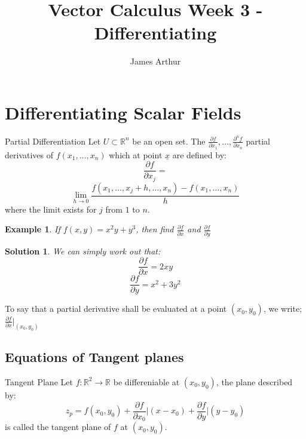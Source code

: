 \documentclass{article}
\title{Vector Calculus Week 3 - Differentiating}
\author{James Arthur}
\newcommand{\R}{\mathbb{R}}
\newcommand{\sub}{\subset}
\newcommand{\pd}[2]{\frac{\partial #1}{\partial #2}}
\newtheorem{example}{Example}
\newtheorem{solution}{Solution}
\begin{document}
\maketitle
\tableofcontents\newpage


\section{Differentiating Scalar Fields}

\noindent\begin{definition}{Partial Differentiation}{}
  Let $\displaystyle{U\sub \R^n}$ be an open set. The $\displaystyle{\pd{f}{x_1}, \dots, \pd{^n f}{x_n}}$ partial derivatives of $f(x_1, \dots, x_n)$ which at point $\underline{x}$ are defined by:
  $$ \pd{f}{x_j} =$$ $$ \lim_{h\to 0}{\frac{f(x_1, \dots, x_j + h, \dots, x_n) - f(x_1,\dots,x_n)}{h}}$$
  where the limit exists for $j$ from $1$ to $n$.
\end{definition}\vspace{10pt}

\begin{example}{
  If $f(x, y) = x^2y + y^3$, then find $\displaystyle{\pd{f}{x}}$ and $\displaystyle{\pd{f}{y}}$
}\end{example}\begin{solution}{
  We can simply work out that:
  $$ \pd{f}{x} = 2xy $$
  $$ \pd{f}{y} = x^2 + 3y^2 $$
}\end{solution}\vspace{10pt}

To say that a partial derivative shall be evaluated at a point $(x_0, y_0)$, we write; $\displaystyle{\pd{f}{x}\Bigr|_{(x_0,y_0)}}$

\subsection{Equations of Tangent planes}
\noindent\begin{definition}{Tangent Plane}{}
Let $f : \R^2 \to \R$ be differeniable at $(x_0, y_0)$, the plane described by:
$$ z_p = f(x_0,y_0) + \pd{f}{x_0}\Bigr|(x - x_0) + \pd{f}{y}\Bigr|(y - y_0) $$
is called the tangent plane of $f$ at $(x_0, y_0)$.
\end{definition}\vspace{10pt}
\end{document}
